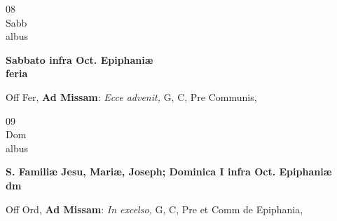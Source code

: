 \documentclass[10pt, openany]{book}
\begin{document}
        \begin{center}
            \begin{minipage}{3.5in}
                \vspace{2em}
                \begin{minipage}{0.5in}
                    {\Huge 08} \\
                    {\normalsize Sabb} \\
                    {\normalsize albus}
                \end{minipage}
                \begin{minipage}{3.0in}
                    \textbf{ \large Sabbato infra Oct. Epiphaniæ \\
                    \textnormal{\normalsize feria}} \\ 
                \end{minipage}
                \begin{justify}Off Fer, \textbf{Ad Missam}: \textit{Ecce advenit,} G, C, Pre Communis,  
                \end{justify}
            \end{minipage}
        \end{center}
    
        \begin{center}
            \begin{minipage}{3.5in}
                \vspace{2em}
                \begin{minipage}{0.5in}
                    {\Huge 09} \\
                    {\normalsize Dom} \\
                    {\normalsize albus}
                \end{minipage}
                \begin{minipage}{3.0in}
                    \textbf{ \large S. Familiæ Jesu, Mariæ, Joseph; Dominica I infra Oct. Epiphaniæ \\
                    \textnormal{\normalsize dm}} \\ 
                \end{minipage}
                \begin{justify}Off Ord, \textbf{Ad Missam}: \textit{In excelso,} G, C, Pre et Comm de Epiphania,  
                \end{justify}
            \end{minipage}
        \end{center}
    
\end{document}
